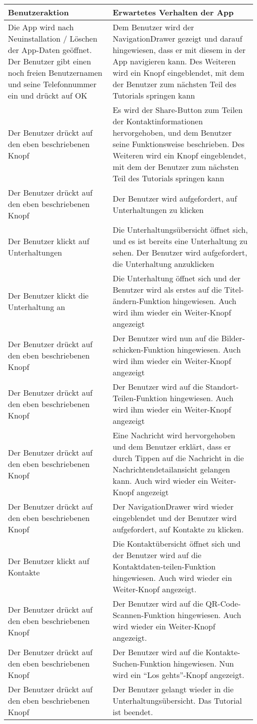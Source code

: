 \begin{longtable}{|p{8cm}|p{8.5cm}|}
\hline
Benutzeraktion & Erwartetes Verhalten der App\tabularnewline
\hline

Die App wird nach Neuinstallation / Löschen der App-Daten geöffnet. Der
Benutzer gibt einen noch freien Benutzernamen und seine Telefonnummer
ein und drückt auf OK & Dem Benutzer wird der NavigationDrawer gezeigt
und darauf hingewiesen, dass er mit diesem in der App navigieren kann.
Des Weiteren wird ein Knopf eingeblendet, mit dem der Benutzer zum
nächsten Teil des Tutorials springen kann\tabularnewline
Der Benutzer drückt auf den eben beschriebenen Knopf & Es wird der
Share-Button zum Teilen der Kontaktinformationen hervorgehoben, und dem
Benutzer seine Funktionsweise beschrieben. Des Weiteren wird ein Knopf
eingeblendet, mit dem der Benutzer zum nächsten Teil des Tutorials
springen kann\tabularnewline
Der Benutzer drückt auf den eben beschriebenen Knopf & Der Benutzer wird
aufgefordert, auf Unterhaltungen zu klicken\tabularnewline
Der Benutzer klickt auf Unterhaltungen & Die Unterhaltungsübersicht
öffnet sich, und es ist bereits eine Unterhaltung zu sehen. Der Benutzer
wird aufgefordert, die Unterhaltung anzuklicken\tabularnewline
Der Benutzer klickt die Unterhaltung an & Die Unterhaltung öffnet sich
und der Benutzer wird als erstes auf die Titel-ändern-Funktion
hingewiesen. Auch wird ihm wieder ein Weiter-Knopf
angezeigt\tabularnewline
Der Benutzer drückt auf den eben beschriebenen Knopf & Der Benutzer wird
nun auf die Bilder-schicken-Funktion hingewiesen. Auch wird ihm wieder
ein Weiter-Knopf angezeigt\tabularnewline
Der Benutzer drückt auf den eben beschriebenen Knopf & Der Benutzer wird
auf die Standort-Teilen-Funktion hingewiesen. Auch wird ihm wieder ein
Weiter-Knopf angezeigt\tabularnewline
Der Benutzer drückt auf den eben beschriebenen Knopf & Eine Nachricht
wird hervorgehoben und dem Benutzer erklärt, dass er durch Tippen auf
die Nachricht in die Nachrichtendetailansicht gelangen kann. Auch wird
wieder ein Weiter-Knopf angezeigt\tabularnewline
Der Benutzer drückt auf den eben beschriebenen Knopf & Der
NavigationDrawer wird wieder eingeblendet und der Benutzer wird
aufgefordert, auf Kontakte zu klicken.\tabularnewline
Der Benutzer klickt auf Kontakte & Die Kontaktübersicht öffnet sich und
der Benutzer wird auf die Kontaktdaten-teilen-Funktion hingewiesen. Auch
wird wieder ein Weiter-Knopf angezeigt.\tabularnewline
Der Benutzer drückt auf den eben beschriebenen Knopf & Der Benutzer wird
auf die QR-Code-Scannen-Funktion hingewiesen. Auch wird wieder ein
Weiter-Knopf angezeigt.\tabularnewline
Der Benutzer drückt auf den eben beschriebenen Knopf & Der Benutzer wird
auf die Kontakte-Suchen-Funktion hingewiesen. Nun wird ein ``Los
gehts''-Knopf angezeigt.\tabularnewline
Der Benutzer drückt auf den eben beschriebenen Knopf & Der Benutzer
gelangt wieder in die Unterhaltungsübersicht. Das Tutorial ist
beendet.\tabularnewline
\hline
\end{longtable}


